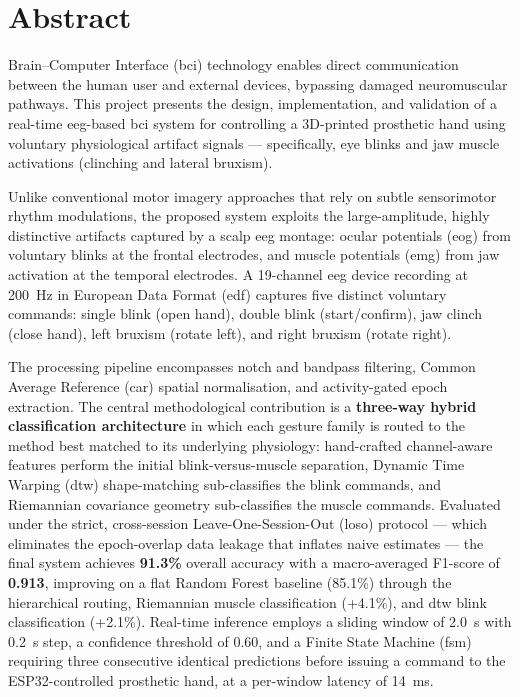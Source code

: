\documentclass[12pt, a4paper, twoside]{report}
\begin{document}
\newpage

\chapter*{Abstract}

Brain--Computer Interface (\acrshort{bci}) technology enables direct
communication between the human user and external devices, bypassing
damaged neuromuscular pathways. This project presents the design,
implementation, and validation of a real-time \acrshort{eeg}-based
\acrshort{bci} system for controlling a 3D-printed prosthetic hand
using voluntary physiological artifact signals — specifically, eye
blinks and jaw muscle activations (clinching and lateral bruxism).

Unlike conventional motor imagery approaches that rely on subtle
sensorimotor rhythm modulations, the proposed system exploits the
large-amplitude, highly distinctive artifacts captured by a scalp
\acrshort{eeg} montage: ocular potentials (\acrshort{eog}) from
voluntary blinks at the frontal electrodes, and muscle potentials
(\acrshort{emg}) from jaw activation at the temporal electrodes. A
19-channel \acrshort{eeg} device recording at \SI{200}{\hertz} in
European Data Format (\acrshort{edf}) captures five distinct voluntary
commands: single blink (open hand), double blink (start/confirm), jaw
clinch (close hand), left bruxism (rotate left), and right bruxism
(rotate right).

The processing pipeline encompasses notch and bandpass filtering,
Common Average Reference (\acrshort{car}) spatial normalisation, and
activity-gated epoch extraction. The central methodological
contribution is a \textbf{three-way hybrid classification
architecture} in which each gesture family is routed to the method
best matched to its underlying physiology: hand-crafted channel-aware
features perform the initial blink-versus-muscle separation, Dynamic
Time Warping (\acrshort{dtw}) shape-matching sub-classifies the blink
commands, and Riemannian covariance geometry sub-classifies the muscle
commands. Evaluated under the strict, cross-session
Leave-One-Session-Out (\acrshort{loso}) protocol --- which eliminates
the epoch-overlap data leakage that inflates naive estimates --- the
final system achieves \textbf{91.3\%} overall accuracy with a
macro-averaged F1-score of \textbf{0.913}, improving on a flat
Random Forest baseline (85.1\%) through the hierarchical routing,
Riemannian muscle classification (+4.1\%), and \acrshort{dtw} blink
classification (+2.1\%). Real-time inference employs a sliding window
of \SI{2.0}{\second} with \SI{0.2}{\second} step, a confidence
threshold of 0.60, and a Finite State Machine (\acrshort{fsm})
requiring three consecutive identical predictions before issuing a
command to the ESP32-controlled prosthetic hand, at a per-window
latency of \SI{14}{\milli\second}.
\end{document}
